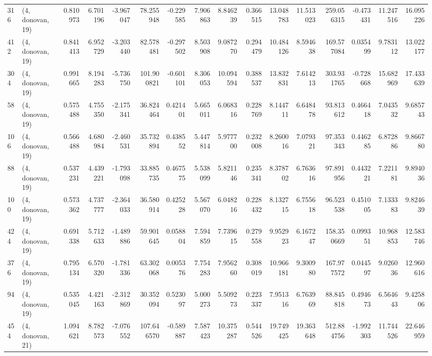 \begin{tabular}{llrrrrrrrrrrrrrr}
316 &  (4, donovan, 19) &   0.810973 &   6.701196 &  -3.967047 &    78.255948 &  -0.229585 &   7.906863 &   8.846239 &  0.366515 &  13.048783 &  11.513023 &   259.056315 & -0.473431 &  11.247516 &  16.095226 \\
412 &  (4, donovan, 19) &   0.841413 &   6.952729 &  -3.203440 &    82.578481 &  -0.297502 &   8.503908 &   9.087270 &  0.294479 &  10.484126 &   8.594638 &   169.577084 &  0.035499 &   9.783112 &  13.022177 \\
304 &  (4, donovan, 19) &   0.991665 &   8.194283 &  -5.736750 &   101.900821 &  -0.601101 &   8.306053 &  10.094594 &  0.388537 &  13.832831 &   7.614213 &   303.931765 & -0.728668 &  15.682969 &  17.433639 \\
58  &  (4, donovan, 19) &   0.575488 &   4.755350 &  -2.175341 &    36.824464 &   0.421401 &   5.665011 &   6.068316 &  0.228769 &   8.144711 &   6.648478 &    93.813612 &  0.466418 &   7.043532 &   9.685743 \\
106 &  (4, donovan, 19) &   0.566488 &   4.680984 &  -2.460531 &    35.732894 &   0.438552 &   5.447814 &   5.977700 &  0.232008 &   8.260016 &   7.079321 &    97.353343 &  0.446285 &   6.872886 &   9.866780 \\
88  &  (4, donovan, 19) &   0.537231 &   4.439221 &  -1.793098 &    33.885735 &   0.467575 &   5.538099 &   5.821146 &  0.235341 &   8.378702 &   6.763616 &    97.891956 &  0.443221 &   7.221181 &   9.894036 \\
100 &  (4, donovan, 19) &   0.573362 &   4.737777 &  -2.364033 &    36.580914 &   0.425228 &   5.567070 &   6.048216 &  0.228432 &   8.132715 &   6.755618 &    96.523538 &  0.451005 &   7.133383 &   9.824639 \\
424 &  (4, donovan, 19) &   0.691338 &   5.712633 &  -1.489886 &    59.901645 &   0.058804 &   7.594859 &   7.739615 &  0.279558 &   9.952923 &   6.167247 &   158.350669 &  0.099351 &  10.968853 &  12.583746 \\
376 &  (4, donovan, 19) &   0.795134 &   6.570320 &  -1.781336 &    63.302068 &   0.005376 &   7.754283 &   7.956260 &  0.308019 &  10.966181 &   9.300980 &   167.977572 &  0.044597 &   9.026036 &  12.960616 \\
94  &  (4, donovan, 19) &   0.535045 &   4.421163 &  -2.312869 &    30.352094 &   0.523097 &   5.000273 &   5.509273 &  0.223337 &   7.951316 &   6.763969 &    88.845818 &  0.494673 &   6.564643 &   9.425806 \\
454 &  (4, donovan, 21) &   1.094621 &   8.782573 &  -7.076552 &   107.646570 &  -0.589887 &   7.587423 &  10.375287 &  0.544526 &  19.749425 &  19.363648 &   512.884756 & -1.992303 &  11.744526 &  22.646959 \\

\end{tabular}
